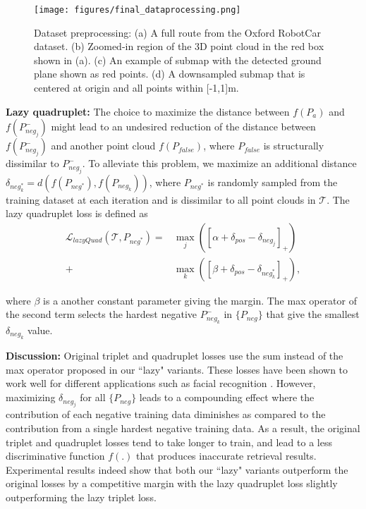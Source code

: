 \documentclass[10pt,twocolumn,letterpaper]{article}
\begin{document}
\begin{figure*}[h]
	\begin{center}
		\texttt{[image: figures/final\_dataprocessing.png]}
	\end{center}
	\vspace{-0.3cm}
	\caption{Dataset preprocessing: (a) A full route from the Oxford RobotCar dataset. (b) Zoomed-in region of the 3D point cloud in the red box shown in (a). (c) An example of submap with the detected ground plane shown as red points. (d) A downsampled submap that is centered at origin and all points within [-1,1]m.\vspace{-0.4cm}}
	\label{fig:dataProcessing}
\end{figure*}

\noindent \textbf{Lazy quadruplet:} The choice to maximize the distance between $f(P_a)$ and $f(P_{neg_j}^{-})$ might lead to an undesired reduction of the distance between $f(P_{neg_j}^{-})$ and another point cloud $f(P_{false})$, where $P_{false}$ is structurally dissimilar to $P_{neg_j}^{-}$.
To alleviate this problem, we maximize an additional distance $\delta_{neg_k^*}=d(f(P_{neg^*}),f(P_{neg_k}))$, where $P_{neg^*}$ is randomly sampled from the training dataset at each iteration and is dissimilar to all point clouds in $\mathcal{T}$.
The lazy quadruplet loss is defined as
\begin{equation}
\begin{split}
\mathcal{L}_{lazyQuad}(\mathcal{T},P_{neg^*})=&\max_{j}([\alpha+\delta_{pos}-\delta_{neg_{j}}]_{+})\\
+&\max_{k}([\beta+\delta_{pos}-\delta_{neg_{k}^*}]_{+}),
\end{split}
\label{fig:lazyQuad}
\end{equation}

\noindent where $\beta$ is a another constant parameter giving the margin. The max operator of the second term selects the hardest negative $P_{neg_k}^{-}$ in $\{P_{neg}\}$ that give the smallest $\delta_{neg_k}$ value.
\newline


\noindent \textbf{Discussion:} Original triplet and quadruplet losses use the sum instead of the max operator proposed in our ``lazy" variants. These losses have been shown to work well for different applications such as facial recognition \cite{DBLP:journals/corr/SchroffKP15, DBLP:journals/corr/ChenCZH17}. However, maximizing $\delta_{neg_{j}}$ for all $\{P_{neg}\}$ leads to a compounding effect where the contribution of each negative training data diminishes
as compared to the contribution from a single hardest negative training data. As a result, the original triplet and quadruplet losses tend to take longer to train, and lead to a less discriminative function $f(.)$ that produces inaccurate retrieval results.
Experimental results indeed show that both our ``lazy" variants outperform the original losses by a competitive margin with the lazy quadruplet loss slightly outperforming the lazy triplet loss.
\end{document}
